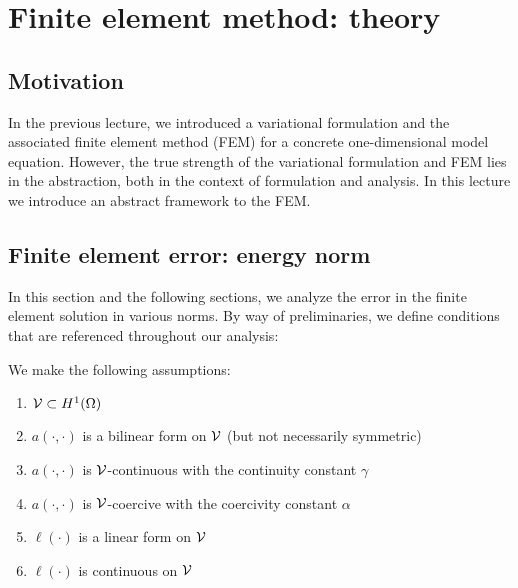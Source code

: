 \chapter{Finite element method: theory}

\disclaimer

\section{Motivation}
In the previous lecture, we introduced a variational formulation and the associated finite element method (FEM) for a concrete one-dimensional model equation.  However, the true strength of the variational formulation and FEM lies in the abstraction, both in the context of formulation and analysis.  In this lecture we introduce an abstract framework to the FEM.




\section{Finite element error: energy norm}
In this section and the following sections, we analyze the error in the finite element solution in various norms. By way of preliminaries, we define conditions that are referenced throughout our analysis:
\begin{assumption}
  We make the following assumptions:
\begin{enumerate}
  \item $\mathcal{V} \subset H^1(\Omega)$
  \item $a(\cdot,\cdot)$ is a bilinear form on $\mathcal{V}$ (but not necessarily symmetric)
  \item $a(\cdot,\cdot)$ is $\mathcal{V}$-continuous with the continuity constant $\gamma$
  \item $a(\cdot,\cdot)$ is $\mathcal{V}$-coercive with the coercivity constant $\alpha$
  \item $\ell(\cdot)$ is a linear form on $\mathcal{V}$
  \item $\ell(\cdot)$ is continuous on $\mathcal{V}$
\end{enumerate}
\end{assumption}


